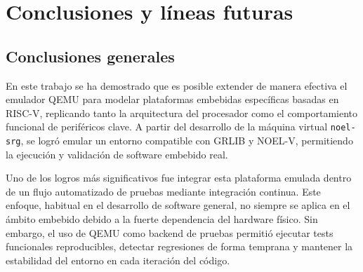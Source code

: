 %
%
%
% 
%
%
%
%

\chapter{Conclusiones y líneas futuras}
\label{cha:conclusiones}

\section{Conclusiones generales}

En este trabajo se ha demostrado que es posible extender de manera efectiva el emulador QEMU para modelar plataformas embebidas específicas basadas en RISC-V, replicando tanto la arquitectura del procesador como el comportamiento funcional de periféricos clave. A partir del desarrollo de la máquina virtual \texttt{noel-srg}, se logró emular un entorno compatible con GRLIB y NOEL-V, permitiendo la ejecución y validación de software embebido real.

Uno de los logros más significativos fue integrar esta plataforma emulada dentro de un flujo automatizado de pruebas mediante integración continua. Este enfoque, habitual en el desarrollo de software general, no siempre se aplica en el ámbito embebido debido a la fuerte dependencia del hardware físico. Sin embargo, el uso de QEMU como backend de pruebas permitió ejecutar tests funcionales reproducibles, detectar regresiones de forma temprana y mantener la estabilidad del entorno en cada iteración del código.

